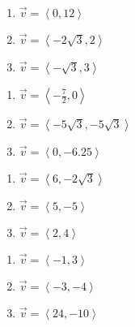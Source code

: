 \documentclass{ximera}
\begin{document}
\begin{multicols}{3}

\begin{enumerate}

\setcounter{enumi}{\value{HW}}

\item $\vec{v} = \left<0,12\right>$
\item $\vec{v} = \left<-2\sqrt{3}, 2\right>$
\item $\vec{v} = \left<-\sqrt{3}, 3\right>$

\setcounter{HW}{\value{enumi}}

\end{enumerate}

\end{multicols}

\begin{multicols}{3}

\begin{enumerate}

\setcounter{enumi}{\value{HW}}

\item $\vec{v} = \left<-\frac{7}{2}, 0\right>$
\item $\vec{v} = \left<-5\sqrt{3}, -5\sqrt{3}\right>$
\item $\vec{v} = \left<0, -6.25\right>$

\setcounter{HW}{\value{enumi}}

\end{enumerate}

\end{multicols}

\begin{multicols}{3}

\begin{enumerate}

\setcounter{enumi}{\value{HW}}

\item $\vec{v} = \left<6, -2\sqrt{3}\right>$
\item $\vec{v} = \left<5, -5\right>$
\item $\vec{v} = \left<2,4\right>$

\setcounter{HW}{\value{enumi}}

\end{enumerate}

\end{multicols}

\begin{multicols}{3}

\begin{enumerate}

\setcounter{enumi}{\value{HW}}

\item $\vec{v} = \left<-1, 3\right>$
\item $\vec{v} = \left<-3, -4\right>$
\item $\vec{v} = \left<24, -10\right>$

\setcounter{HW}{\value{enumi}}

\end{enumerate}

\end{multicols}
\end{document}
